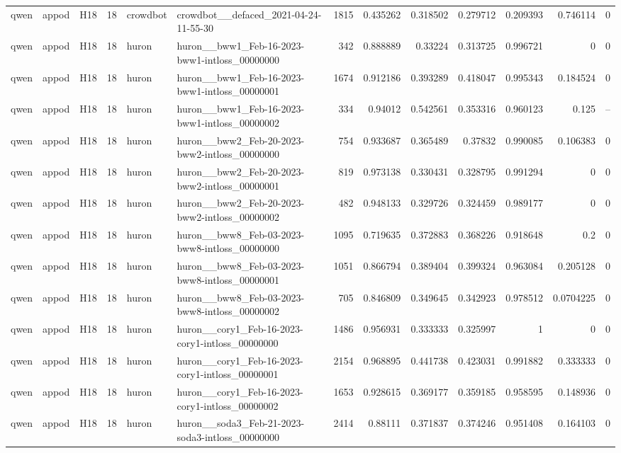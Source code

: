 \begin{longtable}{lllrllrrrrrrr}
qwen & appod & H18 & 18 & crowdbot & crowdbot\_\_defaced\_2021-04-24-11-55-30 & 1815 & 0.435262 & 0.318502 & 0.279712 & 0.209393 & 0.746114 & 0 \\
qwen & appod & H18 & 18 & huron & huron\_\_bww1\_Feb-16-2023-bww1-intloss\_00000000 & 342 & 0.888889 & 0.33224 & 0.313725 & 0.996721 & 0 & 0 \\
qwen & appod & H18 & 18 & huron & huron\_\_bww1\_Feb-16-2023-bww1-intloss\_00000001 & 1674 & 0.912186 & 0.393289 & 0.418047 & 0.995343 & 0.184524 & 0 \\
qwen & appod & H18 & 18 & huron & huron\_\_bww1\_Feb-16-2023-bww1-intloss\_00000002 & 334 & 0.94012 & 0.542561 & 0.353316 & 0.960123 & 0.125 & -- \\
qwen & appod & H18 & 18 & huron & huron\_\_bww2\_Feb-20-2023-bww2-intloss\_00000000 & 754 & 0.933687 & 0.365489 & 0.37832 & 0.990085 & 0.106383 & 0 \\
qwen & appod & H18 & 18 & huron & huron\_\_bww2\_Feb-20-2023-bww2-intloss\_00000001 & 819 & 0.973138 & 0.330431 & 0.328795 & 0.991294 & 0 & 0 \\
qwen & appod & H18 & 18 & huron & huron\_\_bww2\_Feb-20-2023-bww2-intloss\_00000002 & 482 & 0.948133 & 0.329726 & 0.324459 & 0.989177 & 0 & 0 \\
qwen & appod & H18 & 18 & huron & huron\_\_bww8\_Feb-03-2023-bww8-intloss\_00000000 & 1095 & 0.719635 & 0.372883 & 0.368226 & 0.918648 & 0.2 & 0 \\
qwen & appod & H18 & 18 & huron & huron\_\_bww8\_Feb-03-2023-bww8-intloss\_00000001 & 1051 & 0.866794 & 0.389404 & 0.399324 & 0.963084 & 0.205128 & 0 \\
qwen & appod & H18 & 18 & huron & huron\_\_bww8\_Feb-03-2023-bww8-intloss\_00000002 & 705 & 0.846809 & 0.349645 & 0.342923 & 0.978512 & 0.0704225 & 0 \\
qwen & appod & H18 & 18 & huron & huron\_\_cory1\_Feb-16-2023-cory1-intloss\_00000000 & 1486 & 0.956931 & 0.333333 & 0.325997 & 1 & 0 & 0 \\
qwen & appod & H18 & 18 & huron & huron\_\_cory1\_Feb-16-2023-cory1-intloss\_00000001 & 2154 & 0.968895 & 0.441738 & 0.423031 & 0.991882 & 0.333333 & 0 \\
qwen & appod & H18 & 18 & huron & huron\_\_cory1\_Feb-16-2023-cory1-intloss\_00000002 & 1653 & 0.928615 & 0.369177 & 0.359185 & 0.958595 & 0.148936 & 0 \\
qwen & appod & H18 & 18 & huron & huron\_\_soda3\_Feb-21-2023-soda3-intloss\_00000000 & 2414 & 0.88111 & 0.371837 & 0.374246 & 0.951408 & 0.164103 & 0 \\

\end{longtable}
